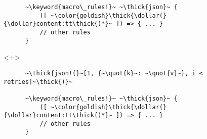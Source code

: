 \documentclass[usepdftitle=false]{beamer}
\newcommand{\dollar}{\makebox[\widthof{\$}][c]{\$}}
\newcommand{\thick}[1]{\contourlength{0.16pt}\contour[10]{black}{#1}}
\newcommand{\slantbox}[2][.5]
  {%
    \mbox
      {%
        \sbox{\foobox}{#2}%
        \hskip\wd\foobox
        \pdfsave
        \pdfsetmatrix{1 0 #1 1}%
        \llap{\usebox{\foobox}}%
        \pdfrestore
      }%
  }
\newcommand{\backslantbox}[2][.5]
  {%
    \mbox
      {%
        \sbox{\foobox}{#2}%
        \hskip\wd\foobox
        \pdfsave
        \pdfsetmatrix{-1 0 #1 1}%
        \llap{\usebox{\foobox}}%
        \pdfrestore
      }%
  }
\newcommand{\openquote}{\backslantbox[.2]{\hspace{11pt}''\hspace{-11pt}}}
\newcommand{\closequote}{\slantbox[-.2]{\hspace{2pt}''\hspace{-2pt}}}
\newcommand{\blackquote}[1]{\openquote#1\closequote}
\newcommand{\quot}[1]{{\color{redish}\blackquote{#1}}}
\newcommand{\keyword}[1]{\color{greenish}#1}
\begin{document}
\begin{frame}[fragile]
\begin{onlyenv}
\begin{verbatim}
      ~\keyword{macro\_rules!}~ ~\thick{json}~ {
          ([ ~\color{goldish}\thick{\dollar(}{\dollar}content:tt\thick{)*}~ ]) => { ... }
          // other rules
      }
    \end{verbatim}
  \end{onlyenv}
  \begin{onlyenv}<+>
    \vspace{-20.5pt}
    \begin{verbatim}
      ~\thick{json!(}~[1, {~\quot{k}~: ~\quot{v}~}, i < retries]~\thick{)}~

      ~\keyword{macro\_rules!}~ ~\thick{json}~ {
          ([ ~\color{goldish}\thick{\dollar(}{\dollar}content:tt\thick{)*}~ ]) => { ... }
          // other rules
      }
    \end{verbatim}
  \end{onlyenv}
\end{frame}
\end{document}
